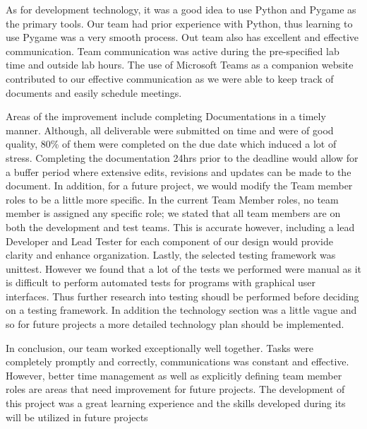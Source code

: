 \documentclass{article}
\begin{document}
	As for development technology, it was a good idea to use Python and Pygame as the primary tools.
	Our team had prior experience with Python, thus learning to use Pygame was a very smooth process. 
	Out team also has excellent and effective communication. Team communication was active during the pre-specified lab time and outside lab hours. The use of Microsoft Teams as a companion website contributed to our effective communication as we were able to keep track of documents and easily schedule meetings.
	
	
	Areas of the improvement include completing Documentations in a timely manner.
	Although, all deliverable were submitted on time and were of good quality, 80\% of them were completed on the due date which induced a lot of stress. Completing the documentation 24hrs prior to the deadline would allow for a buffer period where extensive edits, revisions and updates can be made to the document.
	In addition, for a future project, we would modify the Team member roles to be a little more specific. 
	In the current Team Member roles, no team member is assigned any specific role; we stated that all team members are on both the development and test teams. This is accurate however, including a lead Developer and Lead Tester for each component of our design would provide clarity and enhance organization. Lastly, the selected testing framework was unittest. However we found that a lot of the tests we performed were manual as it is difficult to perform automated tests for programs with graphical user interfaces. Thus further research into testing shoudl be performed before deciding on a testing framework.
	In addition the technology section was a little vague and so for future projects a more detailed technology plan should be implemented.

In conclusion, our team worked exceptionally well together. Tasks were completely promptly and correctly, communications was constant and effective. However, better time management as well as explicitly defining team member roles are areas that need improvement for future projects. The development of this project was a great learning experience and the skills developed during its will be utilized in future projects
	
\end{document}
